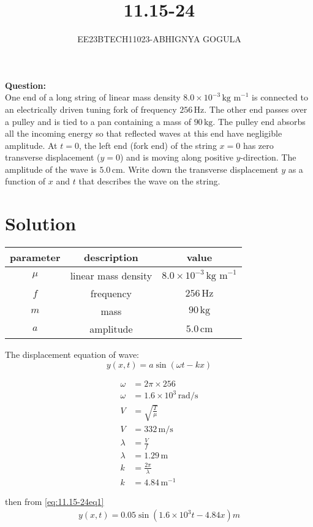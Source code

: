 \documentclass[journal,12pt,twocolumn]{IEEEtran}
\theoremstyle{remark}
\begin{document}

\vspace{3cm}
\title{\textbf{11.15-24}}
\author{EE23BTECH11023-ABHIGNYA GOGULA}
\maketitle
\newpage
\bigskip
\renewcommand{\thefigure}{\theenumi}
\renewcommand{\thetable}{\theenumi}
\textbf{Question:}
\\
 One end of a long string of linear mass density $8.0 \times 10^{-3} \, \text{kg m}^{-1}$ is connected to an electrically driven tuning fork of frequency $256 \, \text{Hz}$. The other end passes over a pulley and is tied to a pan containing a mass of $90 \, \text{kg}$. The pulley end absorbs all the incoming energy so that reflected waves at this end have negligible amplitude. At $t=0$, the left end (fork end) of the string $x=0$ has zero transverse displacement ($y=0$) and is moving along positive $y$-direction. The amplitude of the wave is $5.0 \, \text{cm}$. Write down the transverse displacement $y$ as a function of $x$ and $t$ that describes the wave on the string.
\section*{Solution}
\begin{tabular}{|c|c|c|}
\hline
parameter & description & value \\
\hline 
$\mu$ & linear mass density & $8.0 \times 10^{-3} \, \text{kg m}^{-1}$ \\
\hline
$f$ & frequency & $256 \, \text{Hz}$ \\
\hline
$m$ & mass & $90 \, \text{kg}$ \\
\hline
$a$ & amplitude & $5.0 \, \text{cm}$ \\
\hline
\end{tabular}
The displacement equation of wave: \\
\begin{equation}
    y(x,t) = a \sin(\omega t - kx)
    \label{eq:11.15-24eq1}
\end{equation}

\begin{align}
    \omega &= 2 \pi \times 256 \\
    \omega &= 1.6 \times 10^{3} \, \text{rad/s} \\
    V &= \sqrt{\frac{T}{\mu}} \\
    V &= 332 \, \text{m/s} \\
    \lambda &= \frac{V}{f} \\
    \lambda &= 1.29 \, \text{m} \\
    k &= \frac{2 \pi}{\lambda} \\
    k &= 4.84 \, \text{m}^{-1}
\end{align}

then from \eqref{eq:11.15-24eq1}
\begin{align}
y(x,t)=0.05 \sin(1.6 \times 10^{3} t-4.84x) m
\end{align}
\end{document}
